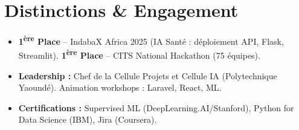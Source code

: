 \documentclass[a4paper,11pt]{article}
\begin{document}
\section{Distinctions \& Engagement}
\begin{itemize}[leftmargin=*, nosep]
    \item \small{\textbf{1\textsuperscript{ère} Place} -- IndabaX Africa 2025 (IA Santé : déploiement API, Flask, Streamlit). \textbf{1\textsuperscript{ère} Place} -- CITS National Hackathon (75 équipes).}
    \item \small{\textbf{Leadership :} Chef de la Cellule Projets et Cellule IA (Polytechnique Yaoundé). Animation workshops : Laravel, React, ML.}
    \item \small{\textbf{Certifications :} Supervised ML (DeepLearning.AI/Stanford), Python for Data Science (IBM), Jira (Coursera).}
\end{itemize}
\end{document}
